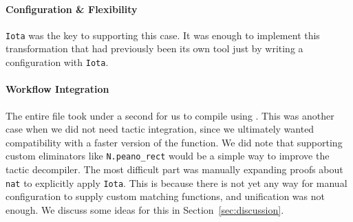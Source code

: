 \paragraph{Configuration \& Flexibility}
\lstinline{Iota} was the key to supporting this case.
It was enough to implement this transformation that had previously been its own tool
just by writing a configuration with \lstinline{Iota}. 

\paragraph{Workflow Integration}
The entire file took under a second for us to compile using \toolname.
This was another case when we did not need tactic integration, since we
ultimately wanted compatibility with a faster version of the function.
We did note that supporting custom eliminators like \lstinline{N.peano_rect} would be a simple way
to improve the tactic decompiler.
The most difficult part was manually expanding proofs about \lstinline{nat}
to explicitly apply \lstinline{Iota}.
This is because there is not yet any way for manual configuration to supply custom matching functions,
and unification was not enough.
We discuss some ideas for this in Section~\ref{sec:discussion}. %





